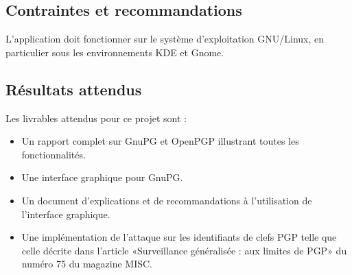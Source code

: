 \documentclass{../res/univ-projet}
\begin{document}
\subsection{Contraintes et recommandations}

L'application doit fonctionner sur le système d'exploitation GNU/Linux, en particulier sous les environnements KDE et Gnome.

\subsection{Résultats attendus}
Les livrables attendus pour ce projet sont :
\begin{itemize}
 \item Un rapport complet sur GnuPG et OpenPGP illustrant toutes les fonctionnalités.
 \item Une interface graphique pour GnuPG.
 \item Un document d'explications et de recommandations à l'utilisation de l'interface graphique.
 \item Une implémentation de l'attaque sur les identifiants de clefs PGP telle que celle décrite dans l'article «Surveillance généralisée : aux limites de PGP» du numéro 75 du magazine MISC.
\end{itemize}
\end{document}
